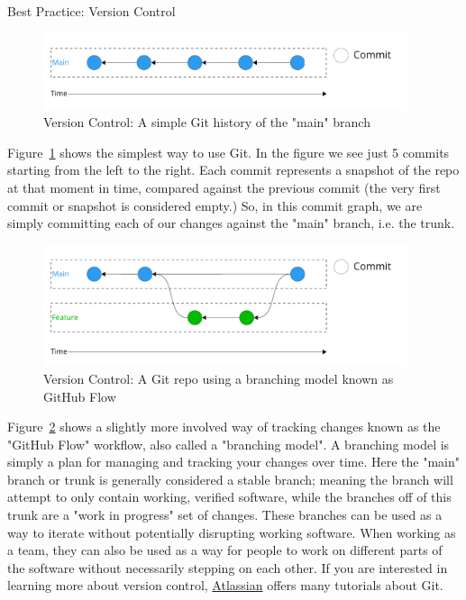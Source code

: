 \documentclass[final]{beamer}
\newlength{\colwidth}
\begin{document}
\begin{frame}[t]
\begin{columns}[t]
\begin{column}{\colwidth}
\begin{block}{Best Practice: Version Control}
    \begin{figure}
      \centering
      \includegraphics[width=0.95\textwidth]{tess2024/git-simple-git-repo.pdf}
      \caption{Version Control: A simple Git history of the "main" branch}
      \label{fig:git-simple}
    \end{figure}

    Figure~\ref*{fig:git-simple} shows the simplest way to use Git.
    In the figure we see just 5 commits starting from the left to the right.
    Each commit represents a snapshot of the repo at that moment in time,
    compared against the previous commit (the very first commit or snapshot
    is considered empty.)
    So, in this commit graph, we are simply committing each of our changes
    against the "main" branch, i.e. the trunk.

    \begin{figure}
      \centering
      \includegraphics[width=0.95\textwidth]{tess2024/git-github-flow.pdf}
      \caption{Version Control: A Git repo using a branching model known as
        GitHub Flow}
      \label{fig:git-github-flow}
    \end{figure}

    Figure~\ref*{fig:git-github-flow} shows a slightly more involved way of
    tracking changes known as the "GitHub Flow" workflow, also called a
    "branching model".
    A branching model is simply a plan for managing and tracking your changes
    over time.
    Here the "main" branch or trunk is generally considered a stable branch;
    meaning the branch will attempt to only contain working, verified software,
    while the branches off of this trunk are a "work in progress" set of
    changes.
    These branches can be used as a way to iterate without potentially
    disrupting working software.
    When working as a team, they can also be used as a way for people to work on
    different parts of the software without necessarily stepping on each other.
    If you are interested in learning more about version control,
    \href{https://www.atlassian.com/git/tutorials/}{Atlassian}\cite{atlassian}
    offers many tutorials about Git.
    

\end{block}
\end{column}
\end{columns}
\end{frame}
\end{document}
